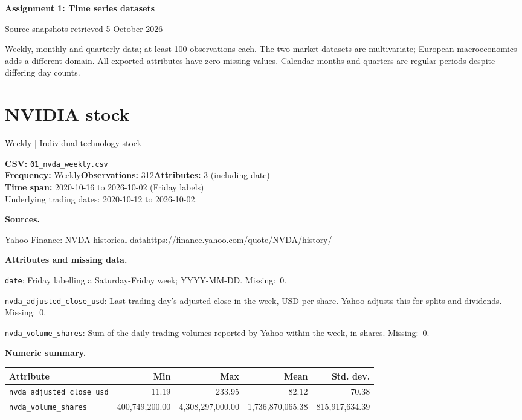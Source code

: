 \documentclass[11pt,a4paper]{article}
\begin{document}
{\Large\bfseries Assignment 1: Time series datasets}\par
{\small Source snapshots retrieved 5 October 2026}\par
{\small Weekly, monthly and quarterly data; at least 100 observations each.
The two market datasets are multivariate; European macroeconomics adds a different domain.
All exported attributes have zero missing values. Calendar months and quarters are regular periods despite differing day counts.}\par

\section{NVIDIA stock}
{\small Weekly | Individual technology stock}\par
{\small\textbf{CSV:} \texttt{01\_nvda\_weekly.csv}\\
\textbf{Frequency:} Weekly\quad\textbf{Observations:} 312\quad\textbf{Attributes:} 3 (including date)\\
\textbf{Time span:} 2020-10-16 to 2026-10-02 (Friday labels)\\
Underlying trading dates: 2020-10-12 to 2026-10-02.}\par
\textbf{Sources.}\par
{\small\href{https://finance.yahoo.com/quote/NVDA/history/}{Yahoo Finance: NVDA historical data}\quad\url{https://finance.yahoo.com/quote/NVDA/history/}}\par
\textbf{Attributes and missing data.}\par
{\small\raggedright\texttt{date}: Friday labelling a Saturday-Friday week; YYYY-MM-DD. \mbox{Missing: 0.}\par}
{\small\raggedright\texttt{nvda\_adjusted\_close\_usd}: Last trading day's adjusted close in the week, USD per share. Yahoo adjusts this for splits and dividends. \mbox{Missing: 0.}\par}
{\small\raggedright\texttt{nvda\_volume\_shares}: Sum of the daily trading volumes reported by Yahoo within the week, in shares. \mbox{Missing: 0.}\par}
\textbf{Numeric summary.}\par
{\footnotesize\setlength{\tabcolsep}{3.5pt}\renewcommand{\arraystretch}{1.25}
\begin{tabular*}{\textwidth}{@{\extracolsep{\fill}}lrrrr@{}}
\toprule Attribute & Min & Max & Mean & Std. dev.\\ \midrule
\texttt{nvda\_adjusted\_close\_usd} & 11.19 & 233.95 & 82.12 & 70.38\\
\texttt{nvda\_volume\_shares} & 400,749,200.00 & 4,308,297,000.00 & 1,736,870,065.38 & 815,917,634.39\\
\bottomrule\end{tabular*}}\par
\end{document}
